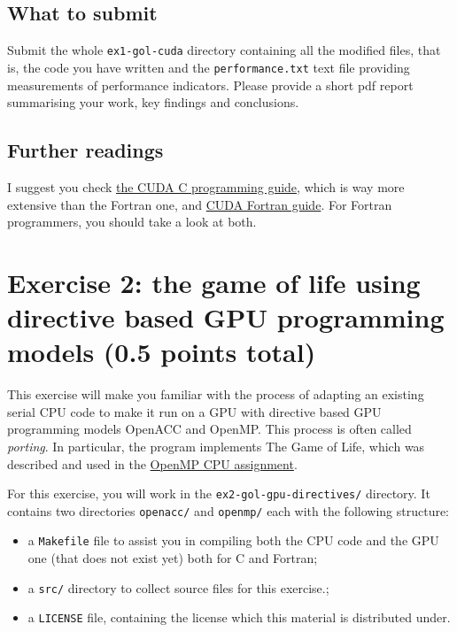 \documentclass[a4paper, 11pt]{article}
\begin{document}
\subsection{What to submit}
Submit the whole \texttt{ex1-gol-cuda} directory containing all the modified files, that is, the code you have written and the \texttt{performance.txt} text file providing measurements of performance indicators. Please provide a short pdf report summarising your work, key findings and conclusions. 

\subsection{Further readings}

I suggest you check \href{https://docs.nvidia.com/cuda/cuda-c-programming-guide/index.html}{the CUDA C programming guide}, which is way more extensive than the Fortran one, and \href{https://www.pgroup.com/resources/docs/20.4/pdf/pgi20cudaforug.pdf}{CUDA Fortran guide}. For Fortran programmers, you should take a look at both.

\section{Exercise 2: the game of life using directive based GPU programming models (0.5 points total)}
   
        This exercise will make you familiar with the process of adapting an existing serial CPU code to make it run on a GPU with directive based GPU programming models OpenACC and OpenMP. This process is often called \textit{porting}. In particular, the program implements The Game of Life, which was described and used in the \href{https://internal.pawsey.org.au/share/s/Cc3Tm7DDR_Srd2YjUrTusw}{OpenMP CPU assignment}.

        For this exercise, you will work in the \texttt{ex2-gol-gpu-directives/} directory. It contains two directories \texttt{openacc/} and \texttt{openmp/} each with the following structure:
        \begin{itemize}
                \item a \texttt{Makefile} file to assist you in compiling both the CPU code and the GPU one (that does not exist yet) both for C and Fortran;
                \item a \texttt{src/} directory to collect source files for this exercise.;
                \item a \texttt{LICENSE} file, containing the license which this material is distributed under.
        \end{itemize}
\end{document}
